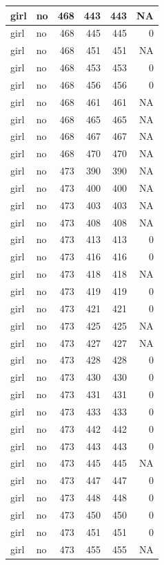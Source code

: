 \documentclass[man]{apa6}
\begin{document}
\begin{tabular}{l|l|r|r|r|r}
\hline
girl & no & 468 & 443 & 443 & NA\\
\hline
girl & no & 468 & 445 & 445 & 0\\
\hline
girl & no & 468 & 451 & 451 & NA\\
\hline
girl & no & 468 & 453 & 453 & 0\\
\hline
girl & no & 468 & 456 & 456 & 0\\
\hline
girl & no & 468 & 461 & 461 & NA\\
\hline
girl & no & 468 & 465 & 465 & NA\\
\hline
girl & no & 468 & 467 & 467 & NA\\
\hline
girl & no & 468 & 470 & 470 & NA\\
\hline
girl & no & 473 & 390 & 390 & NA\\
\hline
girl & no & 473 & 400 & 400 & NA\\
\hline
girl & no & 473 & 403 & 403 & NA\\
\hline
girl & no & 473 & 408 & 408 & NA\\
\hline
girl & no & 473 & 413 & 413 & 0\\
\hline
girl & no & 473 & 416 & 416 & 0\\
\hline
girl & no & 473 & 418 & 418 & NA\\
\hline
girl & no & 473 & 419 & 419 & 0\\
\hline
girl & no & 473 & 421 & 421 & 0\\
\hline
girl & no & 473 & 425 & 425 & NA\\
\hline
girl & no & 473 & 427 & 427 & NA\\
\hline
girl & no & 473 & 428 & 428 & 0\\
\hline
girl & no & 473 & 430 & 430 & 0\\
\hline
girl & no & 473 & 431 & 431 & 0\\
\hline
girl & no & 473 & 433 & 433 & 0\\
\hline
girl & no & 473 & 442 & 442 & 0\\
\hline
girl & no & 473 & 443 & 443 & 0\\
\hline
girl & no & 473 & 445 & 445 & NA\\
\hline
girl & no & 473 & 447 & 447 & 0\\
\hline
girl & no & 473 & 448 & 448 & 0\\
\hline
girl & no & 473 & 450 & 450 & 0\\
\hline
girl & no & 473 & 451 & 451 & 0\\
\hline
girl & no & 473 & 455 & 455 & NA\\

\end{tabular}
\end{document}

